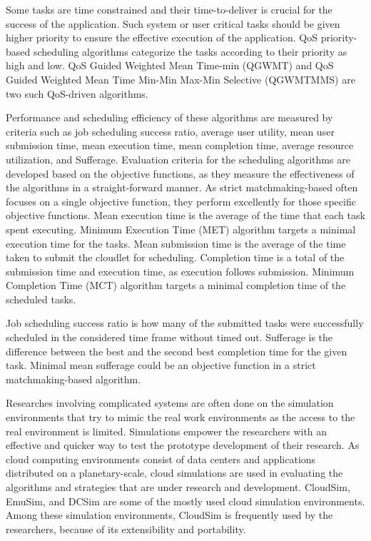 \documentclass[times, 10pt,twocolumn]{article}
\begin{document}
Some tasks are time constrained and their time-to-deliver is crucial for the success of the application. Such system or user critical tasks should be given higher priority to ensure the effective execution of the application. QoS priority-based scheduling algorithms categorize the tasks according to their priority as high and low. QoS Guided Weighted Mean Time-min (QGWMT) and QoS Guided Weighted Mean Time Min-Min Max-Min Selective (QGWMTMMS) are two such QoS-driven algorithms\cite{qosgrid}. 

Performance and scheduling efficiency of these algorithms are measured by criteria such as job scheduling success ratio, average user utility, mean user submission time, mean execution time, mean completion time, average resource utilization, and Sufferage. Evaluation criteria for the scheduling algorithms are developed based on the objective functions, as they measure the effectiveness of the algorithms in a straight-forward manner. As strict matchmaking-based often focuses on a single objective function, they perform excellently for those specific objective functions. Mean execution time is the average of the time that each task spent executing. Minimum Execution Time (MET) algorithm targets a minimal execution time for the tasks. Mean submission time is the average of the time taken to submit the cloudlet for scheduling. Completion time is a total of the submission time and execution time, as execution follows submission. Minimum Completion Time
 (MCT) algorithm targets a minimal completion time of the scheduled tasks.

Job scheduling success ratio is how many of the submitted tasks were successfully scheduled in the considered time frame without timed out. Sufferage is the difference between the best and the second best completion time for the given task\cite{sufferage}. Minimal mean sufferage could be an objective function in a strict matchmaking-based algorithm.


Researches involving complicated systems are often done on the simulation environments that try to mimic the real work environments as the access to the real environment is limited. Simulations empower the researchers with an effective and quicker way to test the prototype development of their research. As cloud computing environments consist of data centers and applications distributed on a planetary-scale, cloud simulations are used in evaluating the algorithms and strategies that are under research and development. CloudSim, EmuSim\cite{emusim}, and DCSim\cite{dcsim} are some of the mostly used cloud simulation environments. Among these simulation environments, CloudSim is frequently used by the researchers, because of its extensibility and portability. 
\end{document}
